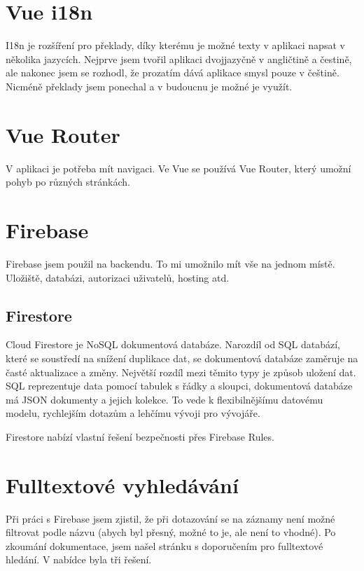 \section{Vue i18n}
I18n je rozšíření pro překlady, díky kterému je možné texty v aplikaci napsat v několika jazycích. Nejprve jsem tvořil aplikaci dvojjazyčně
v angličtině a čestině, ale nakonec jsem se rozhodl, že prozatím dává aplikace smysl pouze v češtině. Nicméně překlady jsem ponechal a v budoucnu
je možné je využít.

\section{Vue Router}
V aplikaci je potřeba mít navigaci. Ve Vue se používá Vue Router, který umožní pohyb po různých stránkách.

\section{Firebase}
Firebase jsem použil na backendu. To mi umožnilo mít vše na jednom místě. Uložiště, databázi, autorizaci uživatelů, hosting atd.

\subsection{Firestore}
Cloud Firestore je NoSQL dokumentová databáze. Narozdíl od SQL databází, které se soustředí na snížení duplikace dat, se dokumentová
databáze zaměruje na časté aktualizace a změny. Největší rozdíl mezi těmito typy je způsob uložení dat. SQL reprezentuje data pomocí
tabulek s řádky a sloupci, dokumentová databáze má JSON dokumenty a jejich kolekce. To vede k flexibilnějšímu datovému modelu, rychlejším
dotazům a lehčímu vývoji pro vývojáře.

Firestore nabízí vlastní řešení bezpečnosti přes Firebase Rules.


\section{Fulltextové vyhledávání}

Při práci s Firebase jsem zjistil, že při dotazování se na záznamy není možné filtrovat podle názvu
(abych byl přesný, možné to je, ale není to vhodné). Po zkoumání dokumentace, jsem našel stránku s doporučením pro
fulltextové hledání. V nabídce byla tři řešení. %

